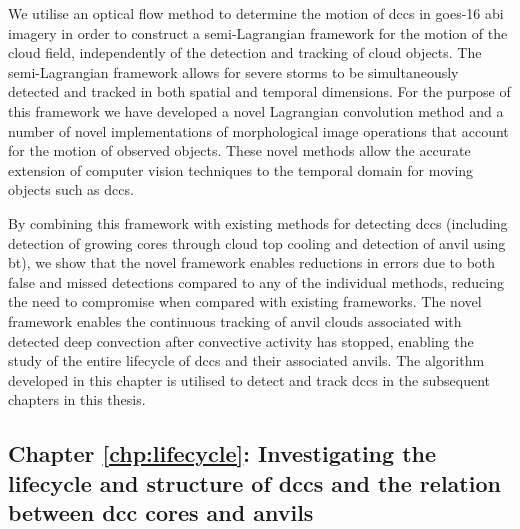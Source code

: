 We utilise an optical flow method to determine the motion of \acrshort{dcc}s in \acrshort{goes}-16 \acrfull{abi} imagery in order to construct a semi-Lagrangian framework for the motion of the cloud field, independently of the detection and tracking of cloud objects.
The semi-Lagrangian framework allows for severe storms to be simultaneously detected and tracked in both spatial and temporal dimensions.
For the purpose of this framework we have developed a novel Lagrangian convolution method and a number of novel implementations of morphological image operations that account for the motion of observed objects.
These novel methods allow the accurate extension of computer vision techniques to the temporal domain for moving objects such as \acrshort{dcc}s.

By combining this framework with existing methods for detecting \acrshort{dcc}s (including detection of growing cores through cloud top cooling and detection of anvil using \acrshort{bt}), we show that the novel framework enables reductions in errors due to both false and missed detections compared to any of the individual methods, reducing the need to compromise when compared with existing frameworks.
The novel framework enables the continuous tracking of anvil clouds associated with detected deep convection after convective activity has stopped, enabling the study of the entire lifecycle of \acrshort{dcc}s and their associated anvils.
The algorithm developed in this chapter is utilised to detect and track \acrshort{dcc}s in the subsequent chapters in this thesis.


\subsection{Chapter \ref{chp:lifecycle}: Investigating the lifecycle and structure of \acrshort{dcc}s and the relation between \acrshort{dcc} cores and anvils}


